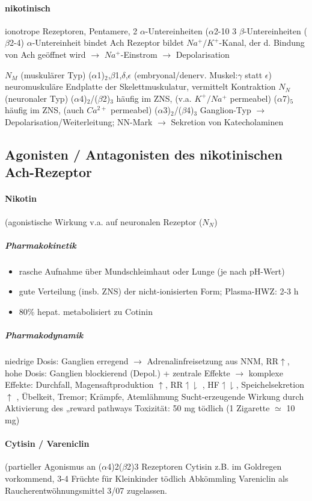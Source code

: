 \documentclass[10pt,a4paper]{report}
\begin{document}
\paragraph{nikotinisch}	
ionotrope Rezeptoren, Pentamere, 
2 $\alpha$-Untereinheiten ($\alpha$2-10
3 $\beta$-Untereinheiten ($\beta$2-4)
$\alpha$-Untereinheit bindet Ach
Rezeptor bildet $Na^+/K^+$-Kanal, 
der d. Bindung von Ach geöffnet wird 
$\rightarrow$ $Na^+$-Einstrom $\rightarrow$ Depolarisation 
 
$N_M$ 	(muskulärer Typ)
($\alpha$1)$_2$,$\beta$1,$\delta$,$\epsilon$ (embryonal/denerv. Muskel:$\gamma$ statt $\epsilon$)
neuromuskuläre Endplatte der Skelettmuskulatur, vermittelt Kontraktion	
$N_N$ 	(neuronaler Typ)
($\alpha$4)$_2$/($\beta$2)$_3$ 	häufig im ZNS, (v.a. $K^+/Na^+$ permeabel)
($\alpha$7)$_5$ 	häufig im ZNS, (auch $Ca^{2+}$ permeabel)
($\alpha$3)$_2$/($\beta$4)$_3$ Ganglion-Typ $\rightarrow$ Depolarisation/Weiterleitung; 
NN-Mark $\rightarrow$ Sekretion von Katecholaminen
\subsection{Agonisten / Antagonisten des nikotinischen Ach-Rezeptor}
\paragraph{Nikotin}(agonistische Wirkung v.a. auf neuronalen Rezeptor ($N_N$) \\
\subparagraph{Pharmakokinetik}
\begin{itemize}
	\item rasche Aufnahme über Mundschleimhaut oder Lunge (je nach pH-Wert)
    \item gute Verteilung (insb. ZNS) der nicht-ionisierten Form; Plasma-HWZ: 2-3 h
    \item 80\% hepat. metabolisiert zu Cotinin
\end{itemize}
\subparagraph{Pharmakodynamik}
 niedrige Dosis: Ganglien  erregend $\rightarrow$ Adrenalinfreisetzung aus NNM, RR$\uparrow$, hohe Dosis: Ganglien blockierend (Depol.) + zentrale Effekte
$\rightarrow$ komplexe Effekte: Durchfall, Magensaftproduktion $\uparrow$, RR$	\upharpoonleft\downharpoonright$ , HF$	\upharpoonleft\downharpoonright$, Speichelsekretion $\uparrow$ , Übelkeit, Tremor; Krämpfe, Atemlähmung Sucht-erzeugende Wirkung durch Aktivierung des „reward pathways Toxizität: 50 mg tödlich (1 Zigarette $\simeq$ 10 mg)
\paragraph{Cytisin / Vareniclin}(partieller Agonismus an ($\alpha$4)2($\beta$2)3 Rezeptoren Cytisin z.B. im Goldregen vorkommend, 3-4 Früchte für Kleinkinder tödlich Abkömmling Vareniclin als Raucherentwöhnungsmittel 3/07 zugelassen.
\end{document}
